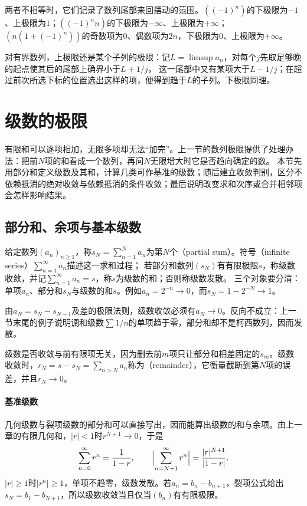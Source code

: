 两者不相等时，它们记录了数列尾部来回摆动的范围。$((-1)^n)$的下极限为$-1$、上极限为$1$；$((-1)^nn)$的下极限为$-\infty$、上极限为$+\infty$；
$(n(1+(-1)^n))$的奇数项为$0$、偶数项为$2n$，下极限为$0$、上极限为$+\infty$。

对有界数列，上极限还是某个子列的极限：记$L=\limsup a_n$，对每个$j$先取足够晚的起点使其后的尾部上确界小于$L+1/j$，
这一尾部中又有某项大于$L-1/j$；在超过前次所选下标的位置选出这样的项，便得到趋于$L$的子列。下极限同理。
\section{级数的极限}
\label{sec:ru-series}
\label{sec:analysis-series}

有限和可以逐项相加，无限多项却无法“加完”。上一节的数列极限提供了处理办法：把前$N$项的和看成一个数列，再问$N$无限增大时它是否趋向确定的数。
本节先用部分和定义级数及其和，计算几类可作基准的级数；随后建立收敛判别，区分不依赖抵消的绝对收敛与依赖抵消的条件收敛；最后说明改变求和次序或合并相邻项会怎样影响结果。

\subsection{部分和、余项与基本级数}
\label{sec:ru-partial-sums}
\label{sec:analysis-series-definition}

给定数列$(a_n)_{n\geq1}$，称$s_N=\sum_{n=1}^Na_n$为第$N$个（partial sum）。符号（infinite series）$\sum_{n=1}^\infty a_n$描述这一求和过程；
若部分和数列$(s_N)$有有限极限$s$，称级数收敛，并记$\sum_{n=1}^\infty a_n=s$，称$s$为级数的和；否则称级数发散。
三个对象要分清：单项$a_n$、部分和$s_N$与级数的和$s$。例如$a_n=2^{-n}\to0$，而$s_N=1-2^{-N}\to1$。

由$a_N=s_N-s_{N-1}$及差的极限法则，级数收敛必须有$a_N\to0$。反向不成立：上一节末尾的例子说明调和级数$\sum1/n$的单项趋于零，部分和却不是柯西数列，因而发散。

级数是否收敛与前有限项无关，因为删去前$m$项只让部分和相差固定的$s_m$。级数收敛时，$r_N=s-s_N=\sum_{n>N}a_n$称为（remainder），它衡量截断到第$N$项的误差，并且$r_N\to0$。

\paragraph{基准级数}
几何级数与裂项级数的部分和可以直接写出，因而能算出级数的和与余项。由上一章的有限几何和，$|r|<1$时$r^{N+1}\to0$，于是
\begin{equation}
 \sum_{n=0}^\infty r^n=\frac1{1-r},\qquad \Bigl|\sum_{n=N+1}^\infty r^n\Bigr|=\frac{|r|^{N+1}}{|1-r|}.
 \label{eq:analysis-geometric-series}
\end{equation}
$|r|\geq1$时$|r^n|\geq1$，单项不趋零，级数发散。若$a_n=b_n-b_{n+1}$，裂项公式给出$s_N=b_1-b_{N+1}$，所以级数收敛当且仅当$(b_n)$有有限极限。

